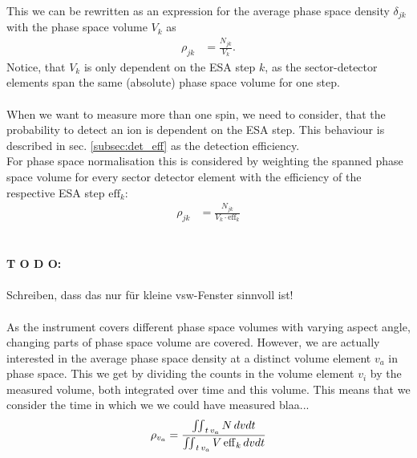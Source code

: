 This we can be rewritten as an expression for the average phase space density $\delta_{jk}$ with the phase space volume $V_{k}$ as 
\begin{align*}
\rho_{jk} &= \frac{N_{jk}}{V_{k}}.
\end{align*}
Notice, that $V_{k}$ is only dependent on the ESA step $k$, as the sector-detector elements span the same (absolute) phase space volume for one step.\\\\
When we want to measure more than one spin, we need to consider, that the probability to detect an ion is dependent on the ESA step. This behaviour is described in sec. \ref{subsec:det_eff} as the detection efficiency.\\
For phase space normalisation this is considered by weighting the spanned phase space volume for every sector detector element with the efficiency of the respective ESA step $\mathrm{eff}_k$: 
\begin{align*}
\rho_{jk} &= \frac{N_{jk}}{V_{k}\cdot \mathrm{eff}_k}
\end{align*}
\\ \\
\textbf{T O D O:}
\\ \\
Schreiben, dass das nur für kleine vsw-Fenster sinnvoll ist!
\\ \\
As the instrument covers different phase space volumes with varying aspect angle, changing parts of phase space volume are covered.
However, we are actually interested in the average phase space density at a distinct volume element $v_a$ in phase space. This we get by dividing the counts in the volume element $v_i$ by the measured volume, both integrated over time and this volume. This means that we consider the time in which we we could have measured blaa...
\begin{align*}
\rho_{v_a} = \frac{\iint\displaylimits_{t\,v_a} N \, dv dt}{\iint\displaylimits_{t\,v_a} V\,\mathrm{eff}_k\,dv dt}
\end{align*}




